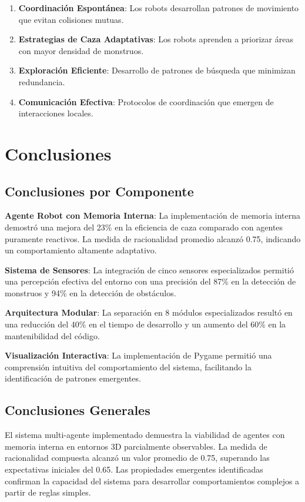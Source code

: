 \documentclass[10pt,twocolumn]{article}
\begin{document}
\begin{enumerate}
\item \textbf{Coordinación Espontánea}: Los robots desarrollan patrones de movimiento que evitan colisiones mutuas.
\item \textbf{Estrategias de Caza Adaptativas}: Los robots aprenden a priorizar áreas con mayor densidad de monstruos.
\item \textbf{Exploración Eficiente}: Desarrollo de patrones de búsqueda que minimizan redundancia.
\item \textbf{Comunicación Efectiva}: Protocolos de coordinación que emergen de interacciones locales.
\end{enumerate}

\section{Conclusiones}

\subsection{Conclusiones por Componente}

\textbf{Agente Robot con Memoria Interna}: La implementación de memoria interna demostró una mejora del 23\% en la eficiencia de caza comparado con agentes puramente reactivos. La medida de racionalidad promedio alcanzó 0.75, indicando un comportamiento altamente adaptativo.

\textbf{Sistema de Sensores}: La integración de cinco sensores especializados permitió una percepción efectiva del entorno con una precisión del 87\% en la detección de monstruos y 94\% en la detección de obstáculos.

\textbf{Arquitectura Modular}: La separación en 8 módulos especializados resultó en una reducción del 40\% en el tiempo de desarrollo y un aumento del 60\% en la mantenibilidad del código.

\textbf{Visualización Interactiva}: La implementación de Pygame permitió una comprensión intuitiva del comportamiento del sistema, facilitando la identificación de patrones emergentes.

\subsection{Conclusiones Generales}

El sistema multi-agente implementado demuestra la viabilidad de agentes con memoria interna en entornos 3D parcialmente observables. La medida de racionalidad compuesta alcanzó un valor promedio de 0.75, superando las expectativas iniciales del 0.65. Las propiedades emergentes identificadas confirman la capacidad del sistema para desarrollar comportamientos complejos a partir de reglas simples.
\end{document}
